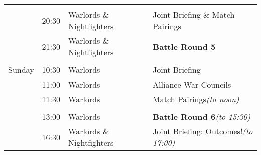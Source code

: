 \begin{center}
\begin{tabular}{C{0.75in}C{0.75in}C{2in}L{3in}}
                                & & & \\
                                & 20:30 & Warlords \& Nightfighters & Joint Briefing \& Match Pairings\\
                                & 21:30 & Warlords \& Nightfighters & \textbf{Battle Round 5}\\
\\
   Sunday   & 10:30 & Warlords                  & Joint Briefing\\
            & 11:00 & Warlords                  & Alliance War Councils\\
            & 11:30 & Warlords                  & Match Pairings\hfill\textit{(to noon)}\\
 & & & \\
            & 13:00 & Warlords                  & \textbf{Battle Round 6}\hfill\textit{(to 15:30)}\\
            & 16:30 & Warlords \& Nightfighters & Joint Briefing: Outcomes!\hfill\textit{(to 17:00)}\\
\end{tabular}
\end{center}
